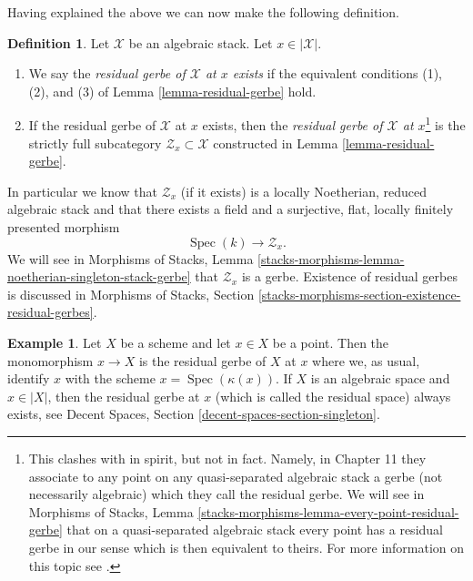 \documentclass{stacks-project}
\theoremstyle{plain}
\theoremstyle{definition}
\newtheorem{definition}[subsection]{Definition}
\newtheorem{example}[subsection]{Example}
\theoremstyle{remark}
\numberwithin{equation}{subsection}
\def\Spec{\mathop{\mathrm{Spec}}}
\begin{document}
\noindent
Having explained the above we can now make the following definition.

\begin{definition}
\label{definition-residual-gerbe}
Let $\mathcal{X}$ be an algebraic stack. Let $x \in |\mathcal{X}|$.
\begin{enumerate}
\item We say the {\it residual gerbe of $\mathcal{X}$ at $x$ exists}
if the equivalent conditions (1), (2), and (3) of
Lemma \ref{lemma-residual-gerbe}
hold.
\item If the residual gerbe of $\mathcal{X}$ at $x$ exists, then the
{\it residual gerbe of $\mathcal{X}$ at $x$}\footnote{This clashes with
\cite{LM-B} in spirit, but not in fact. Namely, in Chapter 11 they associate
to any point on any quasi-separated algebraic stack a gerbe (not necessarily
algebraic) which they call the residual gerbe. We will see in
Morphisms of Stacks, Lemma
\ref{stacks-morphisms-lemma-every-point-residual-gerbe}
that on a quasi-separated algebraic stack every point
has a residual gerbe in our sense which is then equivalent to theirs. For
more information on this topic see
\cite[Appendix B]{rydh_etale_devissage}.}
is the strictly full
subcategory $\mathcal{Z}_x \subset \mathcal{X}$ constructed in
Lemma \ref{lemma-residual-gerbe}.
\end{enumerate}
\end{definition}

\noindent
In particular we know that $\mathcal{Z}_x$ (if it exists) is a
locally Noetherian, reduced algebraic stack and that there exists a
field and a surjective, flat, locally finitely presented morphism
$$
\Spec(k) \longrightarrow \mathcal{Z}_x.
$$
We will see in
Morphisms of Stacks, Lemma
\ref{stacks-morphisms-lemma-noetherian-singleton-stack-gerbe}
that $\mathcal{Z}_x$ is a gerbe. Existence of residual gerbes is
discussed in Morphisms of Stacks, Section
\ref{stacks-morphisms-section-existence-residual-gerbes}.

\begin{example}
\label{example-residual-gerbe}
Let $X$ be a scheme and let $x \in X$ be a point. Then the monomorphism
$x \to X$ is the residual gerbe of $X$ at $x$ where we, as usual, identify
$x$ with the scheme $x = \Spec(\kappa(x))$. If $X$ is an algebraic space
and $x \in |X|$, then the residual gerbe at $x$ (which is called
the residual space) always exists, see
Decent Spaces, Section \ref{decent-spaces-section-singleton}.
\end{example}
\end{document}
